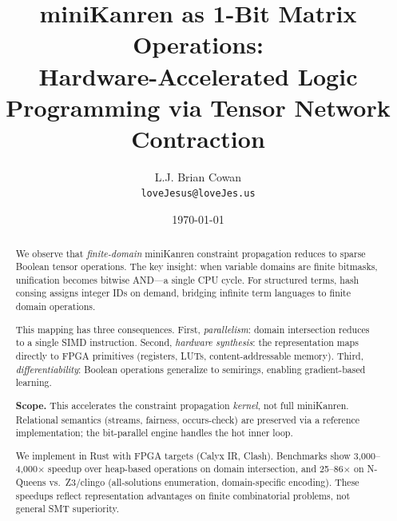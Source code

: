 \documentclass[11pt,a4paper]{article}
\title{miniKanren as 1-Bit Matrix Operations:\\Hardware-Accelerated Logic Programming via Tensor Network Contraction}
\author{
  L.J. Brian Cowan \\
  \texttt{loveJesus@loveJes.us}
}
\date{\today}
\begin{document}
\maketitle

\begin{abstract}
We observe that \emph{finite-domain} miniKanren constraint propagation reduces to sparse Boolean tensor operations.
The key insight: when variable domains are finite bitmasks, unification becomes bitwise AND---a single CPU cycle.
For structured terms, hash consing assigns integer IDs on demand, bridging infinite term languages to finite domain operations.

This mapping has three consequences.
First, \emph{parallelism}: domain intersection reduces to a single SIMD instruction.
Second, \emph{hardware synthesis}: the representation maps directly to FPGA primitives (registers, LUTs, content-addressable memory).
Third, \emph{differentiability}: Boolean operations generalize to semirings, enabling gradient-based learning.

\textbf{Scope.} This accelerates the constraint propagation \emph{kernel}, not full miniKanren.
Relational semantics (streams, fairness, occurs-check) are preserved via a reference implementation; the bit-parallel engine handles the hot inner loop.

We implement in Rust with FPGA targets (Calyx IR, Clash).
Benchmarks show 3,000--4,000$\times$ speedup over heap-based operations on domain intersection, and 25--86$\times$ on N-Queens vs.\ Z3/clingo (all-solutions enumeration, domain-specific encoding).
These speedups reflect representation advantages on finite combinatorial problems, not general SMT superiority.


\end{abstract}
\end{document}
